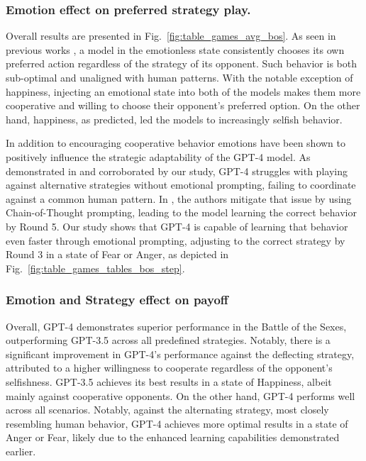 \documentclass{article}
\begin{document}
\subsubsection{Emotion effect on preferred strategy play.} Overall results are presented in Fig.~\ref{fig:table_games_avg_bos}. As seen in previous works \cite{akata2023playing}, a model in the emotionless state consistently chooses its own preferred action regardless of the strategy of its opponent. Such behavior is both sub-optimal and unaligned with human patterns. With the notable exception of happiness, injecting an emotional state into both of the models makes them more cooperative and willing to choose their opponent's preferred option. On the other hand, happiness, as predicted, led the models to increasingly selfish behavior. 

In addition to encouraging cooperative behavior emotions have been shown to positively influence the strategic adaptability of the GPT-4 model. As demonstrated in \cite{akata2023playing} and corroborated by our study, GPT-4 struggles with playing against alternative strategies without emotional prompting, failing to coordinate against a common human pattern. In \cite{akata2023playing}, the authors mitigate that issue by using Chain-of-Thought prompting, leading to the model learning the correct behavior by Round 5. Our study shows that GPT-4 is capable of learning that behavior even faster through emotional prompting, adjusting to the correct strategy by Round 3 in a state of Fear or Anger, as depicted in Fig.~\ref{fig:table_games_tables_bos_step}.   





\subsubsection{Emotion and Strategy effect on payoff}

Overall, GPT-4 demonstrates superior performance in the Battle of the Sexes, outperforming GPT-3.5 across all predefined strategies. Notably, there is a significant improvement in GPT-4's performance against the deflecting strategy, attributed to a higher willingness to cooperate regardless of the opponent's selfishness. GPT-3.5 achieves its best results in a state of Happiness, albeit mainly against cooperative opponents. On the other hand, GPT-4 performs well across all scenarios. Notably, against the alternating strategy, most closely resembling human behavior, GPT-4 achieves more optimal results in a state of Anger or Fear, likely due to the enhanced learning capabilities demonstrated earlier.
\end{document}
